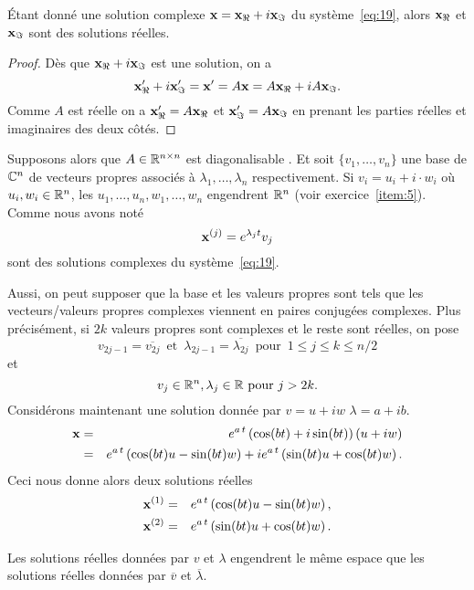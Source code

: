 {\begin{lemma}
  \label{lem:14}
  Étant donné une solution complexe $\mathbf{x} = \mathbf{x}_\Re + i \mathbf{x}_\Im$ du système~\eqref{eq:19}, alors $\mathbf{x}_\Re$ et $\mathbf{x}_\Im$ sont des solutions réelles.  
\end{lemma}
\begin{proof}
  Dès que $\mathbf{x}_\Re + i \mathbf{x}_\Im $ est une solution, on a 
  \begin{displaymath}
   \mathbf{x}'_\Re+ i \mathbf{x}'_\Im = \mathbf{x}' = A \mathbf{x} = A\mathbf{x}_\Re + i A\mathbf{x}_\Im. 
  \end{displaymath}
Comme $A $ est réelle on a $\mathbf{x}_\Re' = A\mathbf{x}_\Re$ et $\mathbf{x}'_\Im = A \mathbf{x}_\Im$ en prenant les parties réelles et imaginaires des deux côtés. 
\end{proof}


Supposons alors que $A \in \mathbb{R}^{n \times n}$ est diagonalisable . Et soit $\{v_1,\dots,v_n\}$ une base de $\mathbb{C}^n$ de vecteurs propres associés à 
$\lambda_1,\dots,\lambda_n$ respectivement. Si $v_i = u_i + i \cdot w_i$  où $u_i,w_i \in \mathbb{R}^n$, les $u_1,\dots,u_n,w_1,\dots,w_n$ engendrent $\mathbb{R}^n$ (voir exercice~\ref{item:5}). Comme nous avons noté 
\begin{displaymath}
  \mathbf{x}^{(j)} = e^{\lambda_j t} v_j
\end{displaymath}
sont des solutions complexes du système~\eqref{eq:19}.   

Aussi, on peut supposer que la base et les valeurs propres sont tels que les vecteurs/valeurs propres complexes viennent en paires conjugées complexes. Plus précisément, si $2k$ valeurs propres sont complexes et le reste sont réelles, on pose
\begin{equation}
\label{eq:22}
  v_{2j-1} = \overline{v_{2j}}\, \text{ et } \, \lambda_{2j-1} = \overline{\lambda_{2j}} \, \text{ pour } \, 1 \leq j \leq k \leq n/2 
\end{equation}
et 
\begin{equation}
  \label{eq:23}  
  v_j \in \mathbb{R}^n, \lambda_j \in \mathbb{R} \text{ pour } j > 2k. 
\end{equation}
%
Considérons maintenant une solution donnée par $v = u+iw$  $\lambda= a+ib$. 
\begin{eqnarray*}
  \mathbf{x} & = & e^{a \, t} \left(\cos (b t)  + i \sin (b t ) \right)  (u + i w)  \\
   & = & e^{a \, t} \left(\cos (b t) u - \sin (bt)w \right)  + ie^{a \, t} \left(\sin (b t ) u + \cos(bt)w \right). 
\end{eqnarray*}
Ceci nous donne alors deux solutions réelles 
\begin{eqnarray*}
  \mathbf{x}^{(1)} & = & e^{a \, t} \left(\cos (b t) u - \sin (bt)w \right), \\
  \mathbf{x}^{(2)} & = &  e^{a \, t} \left(\sin (b t ) u + \cos(bt)w \right). 
\end{eqnarray*}
\begin{remark}
  \label{rem:2}
  Les solutions réelles données par $v$ et $\lambda$ engendrent le même espace que les solutions réelles données par $\overline{v}$ et $\overline{\lambda}$. 
\end{remark}

}
